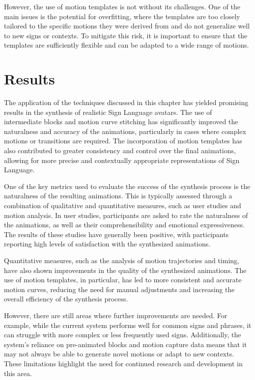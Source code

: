 \documentclass[../../main.tex]{subfiles}
\begin{document}
However, the use of motion templates is not without its challenges. One of the main issues is the potential for overfitting, where the templates are too closely tailored to the specific motions they were derived from and do not generalize well to new signs or contexts. To mitigate this risk, it is important to ensure that the templates are sufficiently flexible and can be adapted to a wide range of motions.

\section{Results}
\label{sec:results}

The application of the techniques discussed in this chapter has yielded promising results in the synthesis of realistic Sign Language avatars. The use of intermediate blocks and motion curve stitching has significantly improved the naturalness and accuracy of the animations, particularly in cases where complex motions or transitions are required. The incorporation of motion templates has also contributed to greater consistency and control over the final animations, allowing for more precise and contextually appropriate representations of Sign Language.

One of the key metrics used to evaluate the success of the synthesis process is the naturalness of the resulting animations. This is typically assessed through a combination of qualitative and quantitative measures, such as user studies and motion analysis. In user studies, participants are asked to rate the naturalness of the animations, as well as their comprehensibility and emotional expressiveness. The results of these studies have generally been positive, with participants reporting high levels of satisfaction with the synthesized animations.

Quantitative measures, such as the analysis of motion trajectories and timing, have also shown improvements in the quality of the synthesized animations. The use of motion templates, in particular, has led to more consistent and accurate motion curves, reducing the need for manual adjustments and increasing the overall efficiency of the synthesis process.

However, there are still areas where further improvements are needed. For example, while the current system performs well for common signs and phrases, it can struggle with more complex or less frequently used signs. Additionally, the system's reliance on pre-animated blocks and motion capture data means that it may not always be able to generate novel motions or adapt to new contexts. These limitations highlight the need for continued research and development in this area.
\end{document}
